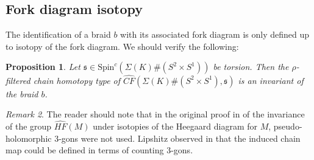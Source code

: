 \documentclass[11pt]{article}
\theoremstyle{plain} \newtheorem{thm}{Theorem}[subsection]
\theoremstyle{plain} \newtheorem{cor}[thm]{Corollary}
\theoremstyle{plain} \newtheorem{prop}[thm]{Proposition}
\theoremstyle{plain} \newtheorem{conj}[thm]{Conjecture}
\theoremstyle{plain} \newtheorem{lem}[thm]{Lemma}
\theoremstyle{definition} \newtheorem{df}[thm]{Definition}
\theoremstyle{remark} \newtheorem{rmk}[thm]{Remark}
\theoremstyle{remark} \newtheorem{obs}[thm]{Observation}
\newcommand{\DBCs}[1]{\Sigma(#1)\#(S^{2}\times S^{1})}
\newcommand{\Scx}[1]{\text{Spin}^{c}(\DBCs{#1})}
\begin{document}
\subsection{Fork diagram isotopy}\label{sec:Riso}

The identification of a braid $b$ with its associated fork diagram is only defined up to isotopy of the fork diagram.  We should verify the following:
\begin{prop}\label{prop:iso}
Let $\mathfrak{s} \in \Scx{K}$ be torsion.  Then the $\rho$-filtered chain homotopy type of $\widehat{CF}(\DBCs{K}, \mathfrak{s})$ is an invariant of the braid $b$.
\end{prop}

\begin{rmk}
The reader should note that in the original proof in \cite{os:disk} of the invariance of the group $\widehat{HF}(M)$ under isotopies of the Heegaard diagram for $M$, pseudo-holomorphic 3-gons were not used.  Lipshitz observed in \cite{lip:cyl} that the induced chain map could be defined in terms of counting 3-gons.
\end{rmk}
\end{document}
